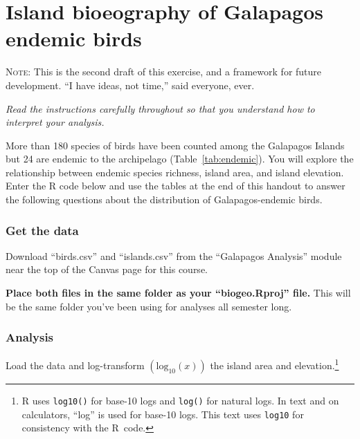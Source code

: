 \documentclass[11pt]{article}
\newcommand*{\assignmentTitle}{Island bioeography of Galapagos endemic birds}
\begin{document}
\thispagestyle{first_page}

\section*{\assignmentTitle}

\textsc{Note:} This is the second draft of this exercise, and a framework for future development. “I have ideas, not time,” said everyone, ever. 

\textit{Read the instructions carefully throughout so that you understand how to interpret your analysis.}

More than 180 species of birds have been counted among the Galapagos Islands but 24 are endemic to the archipelago (Table~\ref{tab:endemic}). You will explore the relationship between endemic species richness, island area, and island elevation. Enter the R code below and use the tables at the end of this handout to answer the following questions about the distribution of Galapagos-endemic birds.  

\subsubsection*{Get the data}

Download “birds.csv” and “islands.csv” from the “Galapagos Analysis” module near the top of the Canvas page for this course.

\textbf{Place both files in the same folder as your “biogeo.Rproj” file.} This will be the same folder you've been using for analyses all semester long.

\subsubsection*{Analysis}

Load the data and log-transform $\left(\mathrm{log}_{10}(x)\right)$ the island area and elevation.\footnote{R uses \texttt{log10()} for base-10 logs and \texttt{log()} for natural logs. In text and on calculators, “log” is used for base-10 logs. This text uses \texttt{log10} for consistency with the R~code.} 
\end{document}
